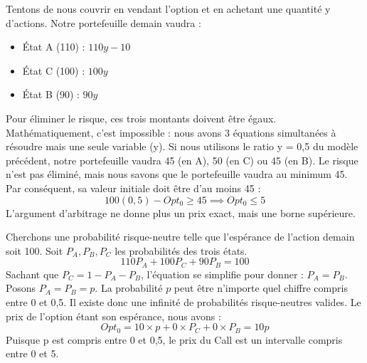 \begin{proofbox}
Tentons de nous couvrir en vendant l'option et en achetant une quantité y d'actions. Notre portefeuille demain vaudra :
\begin{itemize}[label=$\cdot$]
    \item État A (110) : $110y - 10$
    \item État C (100) : $100y$
    \item État B (90) : $90y$
\end{itemize}
Pour éliminer le risque, ces trois montants doivent être égaux. Mathématiquement, c'est impossible : nous avons 3 équations simultanées à résoudre mais une seule variable (y).
Si nous utilisons le ratio y = 0,5 du modèle précédent, notre portefeuille vaudra 45 (en A), 50 (en C) ou 45 (en B). Le risque n'est pas éliminé, mais nous savons que le portefeuille vaudra au minimum 45. Par conséquent, sa valeur initiale doit être d'au moins 45 :
\begin{equation*}
    100(0,5) - Opt_0 \ge 45 \implies Opt_0 \le 5
\end{equation*}
L'argument d'arbitrage ne donne plus un prix exact, mais une borne supérieure.
\end{proofbox}

\begin{examplebox}
Cherchons une probabilité risque-neutre telle que l'espérance de l'action demain soit 100.
Soit $P_A, P_B, P_C$ les probabilités des trois états.
\begin{equation*}
    110 P_A + 100 P_C + 90 P_B = 100
\end{equation*}
Sachant que $P_C = 1 - P_A - P_B$, l'équation se simplifie pour donner : $P_A = P_B$.
Posons $P_A = P_B = p$. La probabilité $p$ peut être n'importe quel chiffre compris entre 0 et 0,5. Il existe donc une infinité de probabilités risque-neutres valides.
Le prix de l'option étant son espérance, nous avons :
\begin{equation*}
    Opt_0 = 10 \times p + 0 \times P_C + 0 \times P_B = 10p
\end{equation*}
Puisque p est compris entre 0 et 0,5, le prix du Call est un intervalle compris entre 0 et 5.
\end{examplebox}


